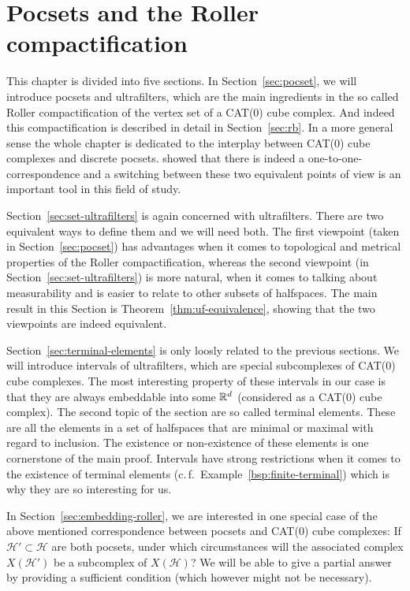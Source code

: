 \section{Pocsets and the Roller compactification}
\label{sec:roller}

This chapter is divided into five sections. In Section~\ref{sec:pocset}, we will introduce pocsets and ultrafilters, which are the main ingredients in the so called Roller compactification of the vertex set of a CAT(0) cube complex. And indeed this compactification is described in detail in Section~\ref{sec:rb}. In a more general sense the whole chapter is dedicated to the interplay between CAT(0) cube complexes and discrete pocsets. \textcite{Roller1999} showed that there is indeed a one-to-one-correspondence and a switching between these two equivalent points of view is an important tool in this field of study.

Section~\ref{sec:set-ultrafilters} is again concerned with ultrafilters. There are two equivalent ways to define them and we will need both. The first viewpoint (taken in Section~\ref{sec:pocset}) has advantages when it comes to topological and metrical properties of the Roller compactification, whereas the second viewpoint (in Section~\ref{sec:set-ultrafilters}) is more natural, when it comes to talking about measurability and is easier to relate to other subsets of halfspaces. The main result in this Section is Theorem~\ref{thm:uf-equivalence}, showing that the two viewpoints are indeed equivalent.

Section~\ref{sec:terminal-elements} is only loosly related to the previous sections. We will introduce intervals of ultrafilters, which are special subcomplexes of CAT(0) cube complexes. The most interesting property of these intervals in our case is that they are always embeddable into some \(\mathbb{R}^d\) (considered as a CAT(0) cube complex). The second topic of the section are so called terminal elements. These are all the elements in a set of halfspaces that are minimal or maximal with regard to inclusion. The existence or non-existence of these elements is one cornerstone of the main proof. Intervals have strong restrictions when it comes to the existence of terminal elements (c.\,f.\ Example~\ref{bsp:finite-terminal}) which is why they are so interesting for us.

In Section~\ref{sec:embedding-roller}, we are interested in one special case of the above mentioned correspondence between pocsets and CAT(0) cube complexes: If \(\mathcal{H'} \subset \mathcal{H}\) are both pocsets, under which circumstances will the associated complex \(X(\mathcal{H}')\) be a subcomplex of \(X(\mathcal{H})\)? We will be able to give a partial answer by providing a sufficient condition (which however might not be necessary).

